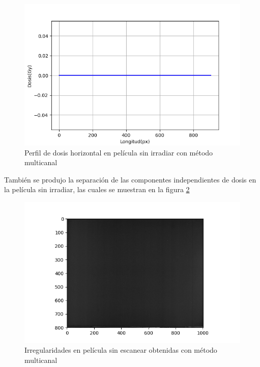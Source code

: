 \begin{figure}[H]
	\centering
	\includegraphics[width=0.7\linewidth]{images/perfilHorizontalDeDosisCeroMulticanal.png}
	\caption{Perfil de dosis horizontal en película sin irradiar con método multicanal }
	\label{fig:perfilCero}
\end{figure}

También se produjo la separación de las componentes independientes de dosis en la película sin irradiar, las cuales se muestran en la figura \ref{fig:irregularCero} 
\begin{figure}[H]
	\centering
	\includegraphics[width=0.7\linewidth]{images/fondoIndependienteDosisPeliculaCero.png}
	\caption{Irregularidades en película sin escanear obtenidas con método multicanal }
	\label{fig:irregularCero}
\end{figure}

